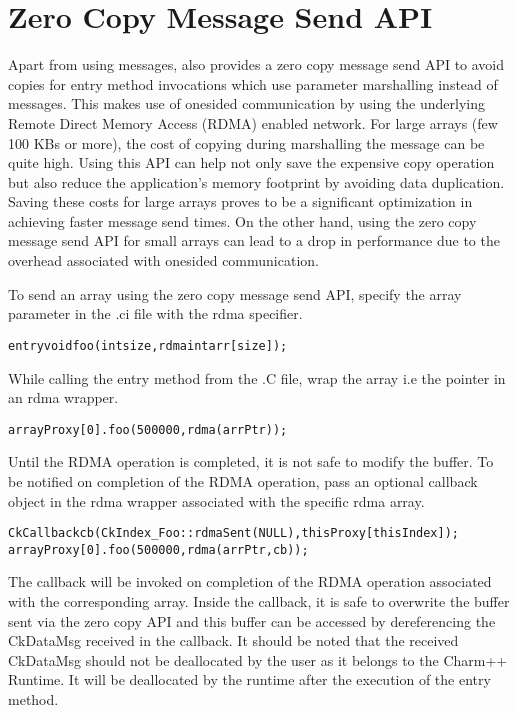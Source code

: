 \section{Zero Copy Message Send API}

\label{nocopyapi}
Apart from using messages, \charmpp{} also provides a zero copy message send
API to avoid copies for entry method invocations which use parameter marshalling
instead of messages. This makes use of onesided communication by using the
underlying Remote Direct Memory Access (RDMA) enabled network.
For large arrays (few 100 KBs or more), the cost of copying during marshalling
the message can be quite high. Using this API can help not only save
the expensive copy operation but also reduce the application's memory footprint
by avoiding data duplication. Saving these costs for large arrays proves
to be a significant optimization in achieving faster message send times.
On the other hand, using the zero copy message send API for small arrays can lead
to a drop in performance due to the overhead associated with onesided communication.

\vspace{0.1in}
\noindent
To send an array using the zero copy message send API, specify the array parameter
in the .ci file with the rdma specifier.

\begin{alltt}
entry void foo (int size, rdma int arr[size]);
\end{alltt}

While calling the entry method from the .C file, wrap the array i.e the
pointer in an rdma wrapper.

\begin{alltt}
arrayProxy[0].foo(500000, rdma(arrPtr));
\end{alltt}

Until the RDMA operation is completed, it is not safe to modify the buffer.
To be notified on completion of the RDMA operation, pass an optional callback object
in the rdma wrapper associated with the specific rdma array.

\begin{alltt}
CkCallback cb(CkIndex_Foo::rdmaSent(NULL), thisProxy[thisIndex]);
arrayProxy[0].foo(500000, rdma(arrPtr, cb));
\end{alltt}

The callback will be invoked on completion of the RDMA operation associated with the
corresponding array. Inside the callback, it is safe to overwrite the buffer sent
via the zero copy API and this buffer can be accessed by dereferencing the CkDataMsg
received in the callback. It should be noted that the received CkDataMsg should not be
deallocated by the user as it belongs to the Charm++ Runtime. It will be deallocated
by the runtime after the execution of the entry method.


